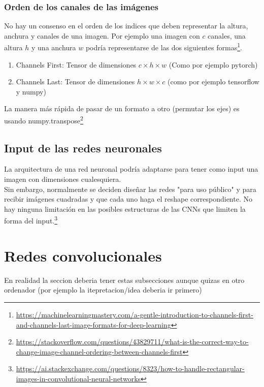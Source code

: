 \documentclass{article}
\begin{document}
\subsubsection{Orden de los canales de las imágenes}
No hay un consenso en el orden de los indices que deben representar la altura, anchura y canales de una imagen. Por ejemplo una imagen con $c$ canales, una altura $h$ y una anchura $w$ podría representarse de las dos siguientes formas\footnote{\url{https://machinelearningmastery.com/a-gentle-introduction-to-channels-first-and-channels-last-image-formats-for-deep-learning}}.\\

\begin{enumerate}
  \item Channels First: Tensor de dimensiones $c\times h\times w$ (Como por ejemplo pytorch)
  \item Channels Last: Tensor de dimensiones $h\times w\times c$ (como por ejemplo tensorflow y numpy)
\end{enumerate}

La manera más rápida de pasar de un formato a otro (permutar los ejes) es usando numpy.transpose\footnote{\url{https://stackoverflow.com/questions/43829711/what-is-the-correct-way-to-change-image-channel-ordering-between-channels-first}}



\subsection{Input de las redes neuronales}

La arquitectura de una red neuronal podría adaptarse para tener como input una imagen con dimensiones cualesquiera.\\

Sin embargo, normalmente se deciden diseñar las redes "para uso público" y para recibir imágenes cuadradas y que cada uno haga el reshape correspondiente. No hay ninguna limitación en las posibles estructuras de las CNNs que limiten la forma del input.\footnote{\url{https://ai.stackexchange.com/questions/8323/how-to-handle-rectangular-images-in-convolutional-neural-networks}}

\section{Redes convolucionales}
En realidad la seccion deberia tener estas subsecciones aunque quizas en otro ordenador (por ejemplo la itepretacion/idea deberia ir primero)
\end{document}
